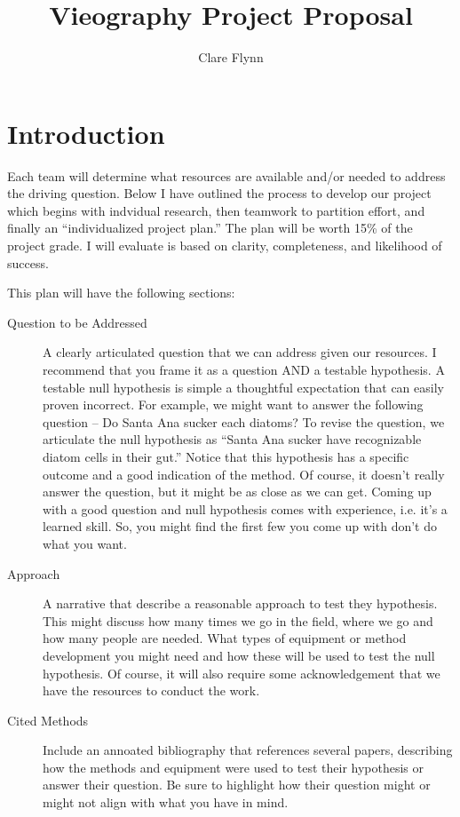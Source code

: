 \documentclass{tufte-handout}
\title{Vieography Project Proposal}
\author{Clare Flynn}
\begin{document}


\maketitle

\section{Introduction}

Each team will determine what resources are available and/or needed to address the driving question. Below I have outlined the process to develop our project which begins with indvidual research, then teamwork to partition effort, and finally an ``individualized project plan.'' The plan will be worth 15\% of the project grade. I will evaluate is based on clarity, completeness, and likelihood of success. 

This plan will have the following sections: 

\begin{description}
  \item[Question to be Addressed] A clearly articulated question that we can address given our resources. I recommend that you frame it as a question AND a testable hypothesis. A testable null hypothesis is simple a thoughtful expectation that can easily proven incorrect. For example, we might want to answer the following question -- Do Santa Ana sucker each diatoms?  To revise the question, we articulate the null hypothesis as ``Santa Ana sucker have recognizable diatom cells in their gut.'' Notice that this hypothesis has a specific outcome and a good indication of the method. Of course, it doesn't really answer the question, but it might be as close as we can get. Coming up with a good question and null hypothesis comes with experience, i.e. it's a learned skill. So, you might find the first few you come up with don't do what you want.   
  \item[Approach] A narrative that describe a reasonable approach to test they hypothesis. This might discuss how many times we go in the field, where we go and how many people are needed. What types of equipment or method development you might need and how these will be used to test the null hypothesis. Of course, it will also require some acknowledgement that we have the resources to conduct the work. 
  \item[Cited Methods] Include an annoated bibliography that references several papers, describing how the methods and equipment were used to test their hypothesis or answer their question. Be sure to highlight how their question might or might not align with what you have in mind.
\end{description}
\end{document}
